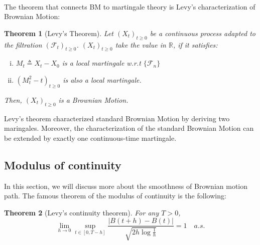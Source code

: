 \documentclass[11pt,english]{smfart}
\newtheorem{theorem}{Theorem}[subsection]
\begin{document}
~\\
The theorem that connects BM to martingale theory is Levy's characterization of Brownian Motion:\\
\begin{theorem}[Levy's Theorem]
    Let $(X_t)_{t\ge 0}$ be a continuous process adapted to the filtration $(\mathcal{F}_t)_{t\ge 0}$. $(X_t)_{t\ge 0}$ take the value in $\mathbb{R}$, if it satisfies:
    \begin{enumerate}[(i)]
        \item $M_t \triangleq X_t - X_0$ is a local martingale w.r.t $\{\mathcal{F}_n\}$
        \item $(M_t^2 -t)_{t\ge 0}$ is also a local martingale.
    \end{enumerate}
    Then, $(X_t)_{t\ge 0}$ is a Brownian Motion.
\end{theorem}

Levy's theorem characterized standard Brownian Motion by deriving two maringales. Moreover, the characterization of the standard Brownian Motion can be extended by exactly one continuous-time martingale. \\


\subsection{Modulus of continuity}

In this section, we will discuss more about the smoothness of Brownian motion path. The famous theorem of the modulus of continuity is the following:\\
\begin{theorem}[Levy's continuity theorem]
    For any $T>0$,
   $$\lim_{h\rightarrow 0} \sup_{t\in [0,T-h]} \frac{ |B(t+h) - B(t)|}{\sqrt{2h\log \frac{1}{h}}} = 1 \quad a.s.$$
\end{theorem}
\end{document}
